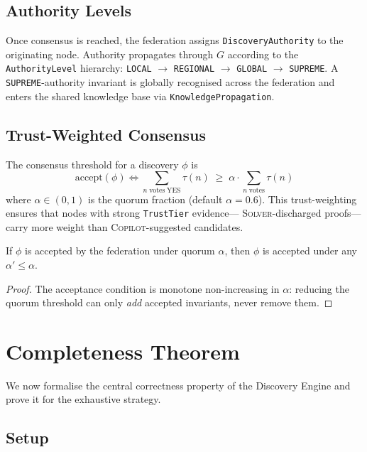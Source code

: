 \documentclass[11pt]{article}
\newcommand{\alg}[1]{\texttt{\small #1}}   %
\begin{document}
\subsection{Authority Levels}

Once consensus is reached, the federation assigns
\texttt{DiscoveryAuthority} to the originating node.  Authority
propagates through $G$ according to the \texttt{AuthorityLevel}
hierarchy: \alg{LOCAL} $\to$ \alg{REGIONAL} $\to$ \alg{GLOBAL}
$\to$ \alg{SUPREME}.  A \alg{SUPREME}-authority invariant is
globally recognised across the federation and enters the
shared knowledge base via \texttt{KnowledgePropagation}.

\subsection{Trust-Weighted Consensus}

The consensus threshold for a discovery $\phi$ is
\[
  \mathrm{accept}(\phi)
  \iff
  \sum_{n \;\mathrm{votes\;YES}} \tau(n)
  \;\geq\;
  \alpha \cdot \sum_{n \;\mathrm{votes}} \tau(n)
\]
where $\alpha \in (0,1)$ is the quorum fraction (default $\alpha = 0.6$).
This trust-weighting ensures that nodes with strong \texttt{TrustTier}
evidence---\eg{} \textsc{Solver}-discharged proofs---carry more
weight than \textsc{Copilot}-suggested candidates.

\begin{proposition}
If $\phi$ is accepted by the federation under quorum $\alpha$, then
$\phi$ is accepted under any $\alpha' \leq \alpha$.
\end{proposition}
\begin{proof}
The acceptance condition is monotone non-increasing in $\alpha$:
reducing the quorum threshold can only \emph{add} accepted invariants,
never remove them.
\end{proof}

\section{Completeness Theorem}\label{sec:completeness}

We now formalise the central correctness property of the Discovery Engine
and prove it for the exhaustive strategy.

\subsection{Setup}
\end{document}
